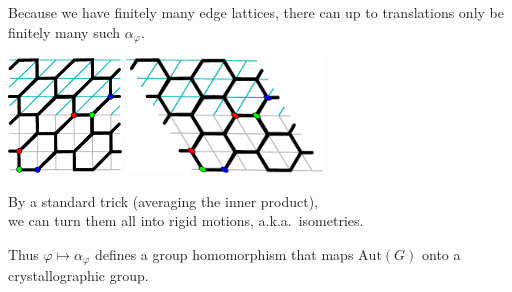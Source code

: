 \documentclass{beamer}
\begin{document}
\begin{frame}
  \begin{center}
    Because we have finitely many edge lattices, there can up to translations
    only be finitely many such $\alpha_\varphi$.

    \includegraphics[height=1.2in]{affine}
    \qquad
    \includegraphics[height=1.2in]{affine-squashed}

    By a standard trick (averaging the inner product),\\
    we can turn them all into rigid motions, a.k.a.\ isometries.

    Thus $\varphi \mapsto \alpha_\varphi$ defines a group homomorphism that
    maps $\mathrm{Aut}(G)$ onto a crystallographic group.
  \end{center}
\end{frame}
\end{document}
